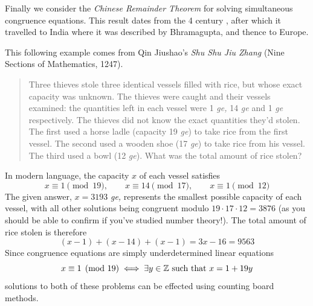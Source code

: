   
Finally we consider the \emph{Chinese Remainder Theorem} for solving simultaneous congruence equations. This result dates from the 4\th{} century \AD, after which it travelled to India where it was described by Bhramagupta, and thence to Europe.\smallbreak

This following example comes from Qin Jiushao's \emph{Shu Shu Jiu Zhang} (Nine Sections of Mathematics, 1247).  

\begin{quote}
	Three thieves stole three identical vessels filled with rice, but whose exact capacity was unknown. The thieves were caught and their vessels examined: the quantities left in each vessel were 1 \emph{ge,} 14 \emph{ge} and 1 \emph{ge} respectively. The thieves did not know the exact quantities they'd stolen. The first used a horse ladle (capacity 19 \emph{ge}) to take rice from the first vessel. The second used a wooden shoe (17 \emph{ge}) to take rice from his vessel. The third used a bowl (12 \emph{ge}). What was the total amount of rice stolen?
\end{quote}
  
In modern language, the capacity $x$ of each vessel satisfies
\[
	x\equiv 1\pmod{19},\qquad x\equiv 14\pmod{17},\qquad x\equiv 1\pmod{12}
\]
The given answer, $x=3193$ \emph{ge,} represents the smallest possible capacity of each vessel, with all other solutions being congruent modulo $19\cdot 17\cdot 12=3876$ (as you should be able to confirm if you've studied number theory!). The total amount of rice stolen is therefore
\[
	(x-1)+(x-14)+(x-1)=3x-16=9563
\]
Since congruence equations are simply underdetermined linear equations
\[
	x\equiv 1\pmod{19}\iff \exists y\in\mathbb{Z}\text{ such that }x=1+19y
\]
solutions to both of these problems can be effected using counting board methods.
  

\bigskip\bigskip

